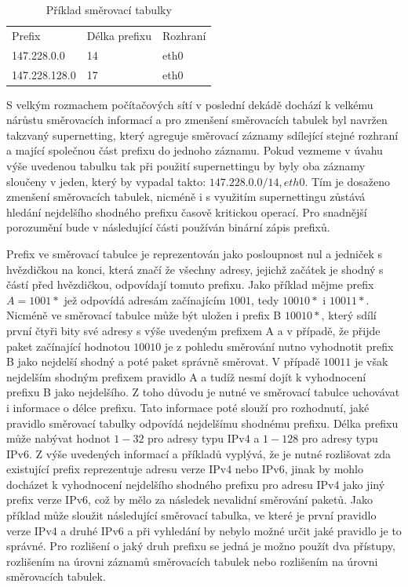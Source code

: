 \begin{table}[!htbp]
	\center
    \begin{tabular}{|l|l|l|}
    \hline
    Prefix        & Délka prefixu & Rozhraní \\ \hhline{|=|=|=|}
    147.228.0.0   & 14            & eth0       \\ \hline
    147.228.128.0 & 17            & eth0       \\ \hline
    \end{tabular}
    \caption{Příklad směrovací tabulky}
    \label{tab:routing-table}
\end{table}

S velkým rozmachem počítačových sítí v poslední dekádě dochází k velkému nárůstu směrovacích informací a
pro zmenšení směrovacích tabulek byl navržen takzvaný supernetting, který agreguje směrovací záznamy
sdílející stejné rozhraní a mající společnou část prefixu do jednoho záznamu.
Pokud vezmeme v úvahu výše uvedenou tabulku tak při použití supernettingu by byly oba záznamy sloučeny
v jeden, který by vypadal takto: $147.228.0.0/14, eth0$.
Tím je dosaženo zmenšení směrovacích tabulek, nicméně i s využitím supernettingu zůstává hledání nejdelšího shodného
prefixu časově kritickou operací.
Pro snadnější porozumění bude v následující části používán binární zápis prefixů.

Prefix ve směrovací tabulce je reprezentován jako posloupnost nul a jedniček s hvězdičkou na konci,
která značí že všechny adresy, jejichž začátek je shodný s částí před hvězdičkou, odpovídají tomuto prefixu.
Jako příklad mějme prefix $A = 1001*$ jež odpovídá adresám začínajícím $1001$, tedy $10010*$ i $10011*$.
Nicméně ve směrovací tabulce může být uložen i prefix B $10010*$, který sdílí první čtyři bity své adresy
s výše uvedeným prefixem A a v případě, že přijde paket začínající hodnotou $10010$ je z pohledu směrování
nutno vyhodnotit prefix B jako nejdelší shodný a poté paket správně směrovat. V případě $10011$ je však nejdelším
shodným prefixem pravidlo A a tudíž nesmí dojít k vyhodnocení prefixu B jako nejdelšího.
Z toho důvodu je nutné ve směrovací tabulce uchovávat i informace o délce prefixu.
Tato informace poté slouží pro rozhodnutí, jaké pravidlo směrovací tabulky odpovídá nejdelšímu shodnému prefixu.
Délka prefixu může nabývat hodnot $1-32$ pro adresy typu
IPv4 a $1-128$ pro adresy typu IPv6.
Z výše uvedených informací a příkladů vyplývá,
že je nutné rozlišovat zda existující prefix reprezentuje adresu verze IPv4 nebo IPv6,
jinak by mohlo docházet k vyhodnocení nejdelšího shodného prefixu pro adresu IPv4
jako jiný prefix verze IPv6, což by mělo za následek nevalidní směrování paketů.
Jako příklad může sloužit následující směrovací tabulka, ve které je první pravidlo
verze IPv4 a druhé IPv6 a při vyhledání by nebylo možné určit jaké pravidlo je to správné.
Pro rozlišení o jaký druh prefixu se jedná je možno použít dva přístupy, rozlišením na úrovni
záznamů směrovacích tabulek nebo rozlišením na úrovni směrovacích tabulek.

